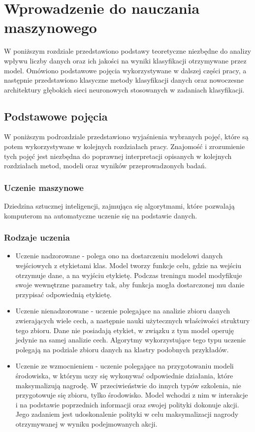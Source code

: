 \newpage %
\section{Wprowadzenie do nauczania maszynowego}
\label{sec:podst}
W poniższym rozdziale przedstawiono podstawy teoretyczne niezbędne do analizy wpływu liczby danych oraz ich jakości na wyniki klasyfikacji otrzymywane przez model. Omówiono podstawowe pojęcia wykorzystywane w dalszej części pracy, a następnie przedstawiono klasyczne metody klasyfikacji danych oraz nowoczesne architektury głębokich sieci neuronowych stosowanych w zadaniach klasyfikacji.
\subsection{Podstawowe pojęcia}
W poniższym podrozdziale przedstawiono wyjaśnienia wybranych pojęć, które są potem wykorzystywane w kolejnych rozdziałach pracy.  Znajomość i zrozumienie tych pojęć jest niezbędna do poprawnej interpretacji opisanych w kolejnych rozdziałach metod, modeli oraz wyników przeprowadzonych badań.
\subsubsection{Uczenie maszynowe}
Dziedzina sztucznej inteligencji, zajmująca się algorytmami, które pozwalają komputerom na automatyczne uczenie się na podstawie danych.\cite{Mitchell1997M}
\subsubsection{Rodzaje uczenia}
\begin{itemize}
	\item Uczenie nadzorowane -  polega ono na dostarczeniu
	modelowi danych wejściowych z etykietami klas. Model tworzy
	funkcje celu, gdzie na wejściu otrzymuje dane, a na wyjściu  etykietę. Podczas treningu model modyfikuje swoje wewnętrzne parametry tak, aby funkcja mogła dostarczonej mu danie przypisać odpowiednią etykietę.\cite{lecun2015deep}
	\item Uczenie nienadzorowane - uczenie polegające na analizie zbioru danych zwierających wiele cech, a następnie nauki użytecznych właściwości struktury tego zbioru. Dane nie posiadają etykiet, w związku z tym model operuję jedynie na samej analizie cech. Algorytmy wykorzystujące tego typu uczenie polegają na podziale zbioru danych na klastry podobnych przykładów.
	\item Uczenie ze wzmocnieniem - uczenie polegające na przygotowaniu modeli środowiska, w którym uczy się wykonywać odpowiednie działania, które maksymalizują nagrodę. W przeciwieństwie do innych typów szkolenia, nie przygotowuje się zbioru, tylko środowisko. Model wchodzi z nim w interakcje i na podstawie poprzednich informacji oraz swojej polityki dokonuje akcji. Jego zadaniem jest udoskonalenie polityki w celu maksymalizacji nagrody otrzymywanej w wyniku podejmowanych akcji. \cite{tf_agents_intro_rl}
\end{itemize}

